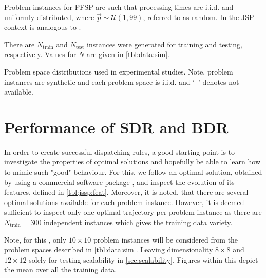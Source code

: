 \documentclass[smallextended]{svjour3}
\begin{document}
	Problem instances for PFSP are such that processing times are i.i.d. and uniformly distributed, 
	  where $\vec{p}\sim\mathcal{U}(1,99)$, referred to as random. In the JSP context   is analogous to .
	
	There are $N_{\text{train}}$  and $N_{\text{test}}$ instances were generated for training and testing, respectively. Values for $N$ are given in \cref{tbl:data:sim}. 
	
	\begin{table}\centering
		\caption[Problem space distributions used in experimental studies.]{Problem space distributions used in experimental studies. Note, problem instances are synthetic and each problem space is i.i.d. and `--' denotes not available.}\label{tbl:data:sim}
		
	\end{table}
	
	
	
	
	\section{Performance of SDR and BDR}\label{sec:opt}
	In order to create successful dispatching rules, a good starting point is to investigate the properties of optimal solutions and hopefully be able to learn how to mimic such "good" behaviour. For this, we follow an optimal solution, obtained by using a commercial software package \cite{gurobi}, and inspect the evolution of its features, defined in \cref{tbl:jssp:feat}. Moreover, it is noted, that there are several optimal solutions available for each problem instance. However, it is deemed sufficient to inspect only one optimal trajectory per problem instance as there are $N_{\text{train}}=300$ independent instances which gives the training data variety. 
	
	Note, for this , only $10\times10$ problem instances will be considered from the problem spaces described in \cref{tbl:data:sim}. Leaving dimensionality $8\times8$ and $12\times12$ solely for testing scalability in \cref{sec:scalability}. 
	Figures within this  depict the mean over all the training data. %
	
\end{document}
